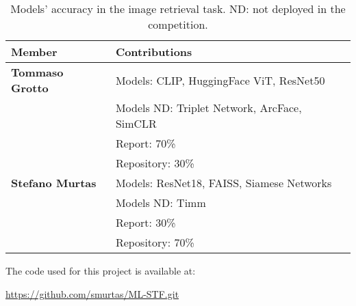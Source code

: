 \documentclass[10pt,twocolumn,letterpaper]{article}
\begin{document}
\begin{table}[ht]
\centering
\caption{Models' accuracy in the image retrieval task. ND: not deployed in the competition.}
\begin{tabular}{ll}
\hline
\textbf{Member} & \textbf{Contributions} \\
\hline
\textbf{Tommaso Grotto} & Models: CLIP, HuggingFace ViT, ResNet50 \\
                        & Models ND: Triplet Network, ArcFace, SimCLR \\
                        & Report: 70\% \\
                        & Repository: 30\% \\
\textbf{Stefano Murtas} & Models: ResNet18, FAISS, Siamese Networks \\
                        & Models ND: Timm \\
                        & Report: 30\% \\
                        & Repository: 70\% \\
\hline
\end{tabular}
\end{table}




The code used for this project is available at:

\url{https://github.com/smurtas/ML-STF.git}
\end{document}

